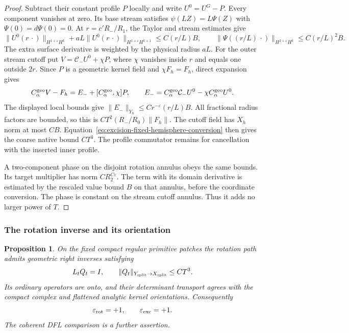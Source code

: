 \documentclass[11pt]{amsart}
\newtheorem{proposition}[theorem]{Proposition}
\theoremstyle{definition}
\theoremstyle{remark}
\theoremstyle{plain}
\begin{document}
\begin{proof}
Subtract their constant profile $P$ locally and
write $U^0=U^G-P$. Every component vanishes at
zero. Its base stream satisfies $\psi(LZ)=L\Psi(Z)$
with $\Psi(0)=d\Psi(0)=0$. At
$r=c'R_-/R_1$, the Taylor and stream estimates give
\[
 \|U^0(r\,\cdot)\|_{H^{1+\varepsilon}H^k}
       +aL\|U^0(r\,\cdot)\|_{H^{1+\varepsilon}H^{k+1}}
          \leq C(r/L)B,\qquad
 \|\Psi((r/L)\,\cdot)\|_{H^{2+\varepsilon}H^k}
          \leq C(r/L)^2B .
\]
The extra surface derivative is weighted by the
physical radius $aL$.
For the outer stream cutoff put
$V=\mathcal C_-U^0+\chi P$, where $\chi$ vanishes
inside $r$ and equals one outside $2r$.
Since $P$ is a geometric kernel field and
$\chi F_h=F_h$, direct expansion gives
\[
 C_\alpha^{\rm geo}V-F_h
        =E_-+[C_\alpha^{\rm geo},\chi]P,\qquad
 E_-=C_\alpha^{\rm geo}\mathcal C_-U^0
                         -\chi C_\alpha^{\rm geo}U^0 .
\]
The displayed local bounds give
$\|E_-\|_{Y_h}\leq Cr^{-\varepsilon}(r/L)B$.
All fractional radius factors are bounded, so
this is $CT^2(R_-/R_0)\|F_h\|$.
The cutoff field has $X_h$ norm at most $CB$.
Equation~\eqref{eq:excision-fixed-hemisphere-conversion}
then gives the coarse native bound $CT^3$.
The profile commutator remains for cancellation
with the inserted inner profile.

A two-component phase on the disjoint rotation
annulus obeys the same bounds. Its target
multiplier has norm $CR_2^{C\varepsilon}$.
The term with its domain derivative is estimated
by the rescaled value bound $B$ on that annulus,
before the coordinate conversion. The phase is
constant on the stream cutoff annulus.
Thus it adds no larger power of $T$.
\end{proof}

\subsubsection{The rotation inverse and its orientation}

\begin{proposition}\label{prop:excision-rotation-orientation}
On the fixed compact regular primitive patches the
rotation path admits geometric right inverses satisfying
\begin{equation}\label{eq:excision-rotation-geometric-inverse}
                  L_tQ_t=I,\qquad
        \|Q_t\|_{Y_{\rm split}\to X_{\rm split}}\leq CT^3 .
\end{equation}
Its ordinary operators are onto, and their determinant
transport agrees with the compact complex and flattened
analytic kernel orientations. Consequently
\begin{equation}\label{eq:excision-evaluated-parities}
                    \varepsilon_{\rm rot}=+1,\qquad
                    \varepsilon_{\rm exc}=+1 .
\end{equation}
The coherent DFL comparison is a further assertion.
\end{proposition}
\end{document}
